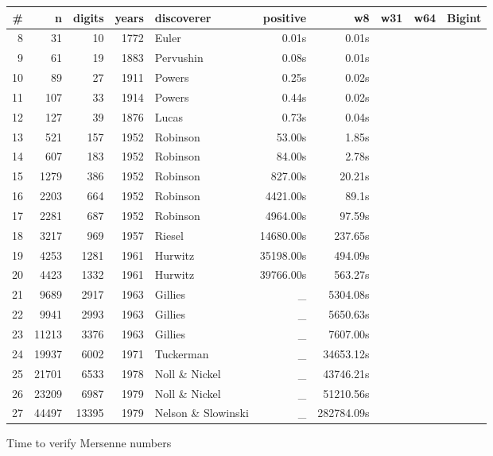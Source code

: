    
\begin{figure}
\begin{center}
\begin{tabular}{|r|r|r|r|l|r|r|r|r|r |}
\hline
\# & n & digits & years &  discoverer &  positive & w8 & w31 & w64 & Bigint\\
\hline
 8 &   31 &  10 & 1772 & Euler      & 0.01s & 0.01s \\
 9 &   61 &  19 & 1883 & Pervushin  & 0.08s & 0.01s \\
10 &   89 &  27 & 1911 & Powers    & 0.25s & 0.02s \\
11 &  107 &  33 & 1914 & Powers    &  0.44s & 0.02s\\
12 &  127 &  39 & 1876 & Lucas     & 0.73s & 0.04s \\
13 &  521 & 157 & 1952 & Robinson  & 53.00s & 1.85s\\
14 &  607 & 183 & 1952 & Robinson  & 84.00s & 2.78s\\
15 & 1279 & 386 & 1952 & Robinson   & 827.00s & 20.21s\\
16 & 2203 & 664 & 1952 & Robinson  & 4421.00s & 89.1s\\
17 & 2281 & 687 & 1952 & Robinson  & 4964.00s & 97.59s\\
18 & 3217 & 969 & 1957 & Riesel    & 14680.00s & 237.65s\\
19 & 4253 & 1281 & 1961 & Hurwitz & 35198.00s & 494.09s\\
20 & 4423 & 1332 & 1961 & Hurwitz & 39766.00s & 563.27s \\
21 & 9689 & 2917  & 1963 & Gillies & \_ & 5304.08s \\	 
22 & 9941 & 2993  & 1963 & Gillies & \_ & 5650.63s \\	 
23 & 11213 & 3376 & 1963 & Gillies &  \_ & 7607.00s \\ 
24 & 19937 & 6002  & 1971 & Tuckerman& \_ & 34653.12s\\
25 & 21701 & 6533 & 1978 & Noll \& Nickel & \_ &43746.21s\\
26 & 23209 & 6987 & 1979 & Noll \&	Nickel & \_ &51210.56s\\
27 & 44497 & 13395 & 1979 & Nelson \& Slowinski & \_ &282784.09s\\
\hline

\end{tabular}
\end{center}
\caption{Time to verify Mersenne numbers}
\label{fig:Mersenne}
\end{figure}
